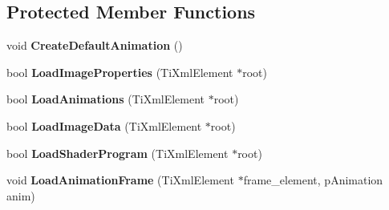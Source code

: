 \subsection*{Protected Member Functions}
\begin{DoxyCompactItemize}
\item 
\hypertarget{classSprite_a8d2e21d5c186e5b9731269f1bd806456}{
void {\bfseries CreateDefaultAnimation} ()}
\label{classSprite_a8d2e21d5c186e5b9731269f1bd806456}

\item 
\hypertarget{classSprite_a8630e5d4d5bf06e6b65d403d18b4556d}{
bool {\bfseries LoadImageProperties} (TiXmlElement $\ast$root)}
\label{classSprite_a8630e5d4d5bf06e6b65d403d18b4556d}

\item 
\hypertarget{classSprite_aa395c53be0556401f5b843a3be9622b1}{
bool {\bfseries LoadAnimations} (TiXmlElement $\ast$root)}
\label{classSprite_aa395c53be0556401f5b843a3be9622b1}

\item 
\hypertarget{classSprite_a6cd6d1d91b460173fa5eb378a7b4924d}{
bool {\bfseries LoadImageData} (TiXmlElement $\ast$root)}
\label{classSprite_a6cd6d1d91b460173fa5eb378a7b4924d}

\item 
\hypertarget{classSprite_ac90c5c9c81695477b00980f3f753db6e}{
bool {\bfseries LoadShaderProgram} (TiXmlElement $\ast$root)}
\label{classSprite_ac90c5c9c81695477b00980f3f753db6e}

\item 
\hypertarget{classSprite_a49a141d864a017fdbc258ae8e214f071}{
void {\bfseries LoadAnimationFrame} (TiXmlElement $\ast$frame\_\-element, pAnimation anim)}
\label{classSprite_a49a141d864a017fdbc258ae8e214f071}

\end{DoxyCompactItemize}
